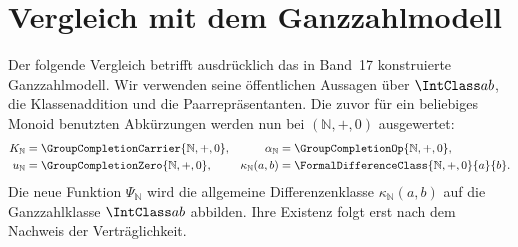 \par{}
\section{Vergleich mit dem Ganzzahlmodell}

Der folgende Vergleich betrifft ausdrücklich das in Band~17 konstruierte
Ganzzahlmodell. Wir verwenden seine öffentlichen Aussagen über
\(\IntClass ab\), die Klassenaddition und die Paarrepräsentanten.
Die zuvor für ein beliebiges Monoid benutzten Abkürzungen werden nun bei
\((\mathbb N,+,0)\) ausgewertet:
\[
\begin{aligned}
 K_{\mathbb N}&=\GroupCompletionCarrier{\mathbb N,+,0},&
 \alpha_{\mathbb N}&=\GroupCompletionOp{\mathbb N,+,0},\\
 u_{\mathbb N}&=\GroupCompletionZero{\mathbb N,+,0},&
 \kappa_{\mathbb N}(a,b)&=\FormalDifferenceClass{\mathbb N,+,0}{a}{b}.
\end{aligned}
\]
Die neue Funktion \(\Psi_{\mathbb N}\) wird die allgemeine Differenzenklasse
\(\kappa_{\mathbb N}(a,b)\) auf die Ganzzahlklasse \(\IntClass ab\) abbilden.
Ihre Existenz folgt erst nach dem Nachweis der Verträglichkeit.

\par{}
\hypertarget{differences.statement.FDProductIntegerSourceTyping}{}
\begin{tabproofwide}
\end{tabproofwide}

